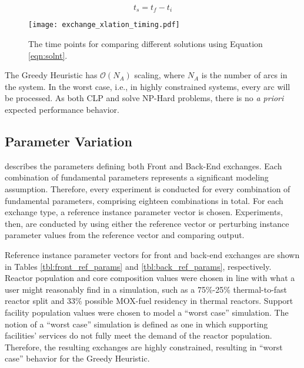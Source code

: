 \begin{equation}\label{eqn:solnt}
t_s = t_f - t_i
\end{equation}

\begin{figure}
  \begin{center}
    \texttt{[image: exchange\_xlation\_timing.pdf]}
    \caption{
      \label{fig:dre_time}
      The time points for comparing different solutions using Equation \ref{eqn:solnt}.}
  \end{center}
\end{figure}

The Greedy Heuristic has $\mathcal{O}(N_A)$ scaling, where $N_A$ is the number
of arcs in the system. In the worst case, i.e., in highly constrained systems,
every arc will be processed. As both CLP and \cbc solve NP-Hard problems, there
is no \textit{a priori} expected performance behavior.

\subsection{Parameter Variation}

 describes the parameters defining both Front
and Back-End exchanges. Each combination of fundamental parameters represents a
significant modeling assumption. Therefore, every experiment is conducted for
every combination of fundamental parameters, comprising eighteen combinations in
total. For each exchange type, a reference instance parameter vector is
chosen. Experiments, then, are conducted by using either the reference vector or
perturbing instance parameter values from the reference vector and comparing
output.

Reference instance parameter vectors for front and back-end exchanges are shown
in Tables \ref{tbl:front_ref_params} and \ref{tbl:back_ref_params},
respectively. Reactor population and core composition values were chosen in line
with what a user might reasonably find in a simulation, such as a 75\%-25\%
thermal-to-fast reactor split and 33\% possible MOX-fuel residency in thermal
reactors. Support facility population values were chosen to model a ``worst
case'' simulation. The notion of a ``worst case'' simulation is defined as one
in which supporting facilities' services do not fully meet the demand of the
reactor population. Therefore, the resulting exchanges are highly constrained,
resulting in ``worst case'' behavior for the Greedy Heuristic. 

